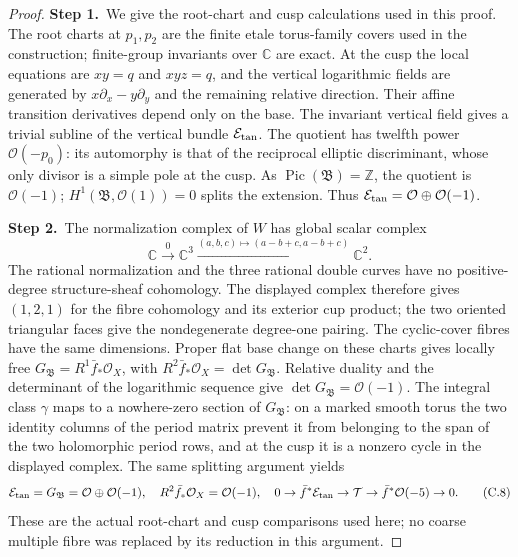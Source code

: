 \documentclass[11pt,a4paper]{article}
\theoremstyle{plain}
\theoremstyle{definition}
\DeclareMathOperator{\Pic}{Pic}
\begin{document}
\begin{proof}
\par\smallskip\noindent\textbf{Step 1.}\ We give the root-chart and cusp calculations used in this proof. The root charts at $p_1,p_2$ are the finite etale torus-family covers used in the construction; finite-group invariants over $\mathbb C$ are exact. At the cusp the local equations are $xy=q$ and $xyz=q$, and the vertical logarithmic fields are generated by $x\partial_x-y\partial_y$ and the remaining relative direction. Their affine transition derivatives depend only on the base. The invariant vertical field gives a trivial subline of the vertical bundle $\mathcal E_{\rm tan}$. The quotient has twelfth power $\mathcal O(-p_0)$: its automorphy is that of the reciprocal elliptic discriminant, whose only divisor is a simple pole at the cusp. As $\Pic(\mathfrak B)=\mathbb Z$, the quotient is $\mathcal O(-1)$; $H^1(\mathfrak B,\mathcal O(1))=0$ splits the extension. Thus $\mathcal E_{\rm tan}=\mathcal O\oplus\mathcal O(-1)$.

\par\smallskip\noindent\textbf{Step 2.}\ The normalization complex of $W$ has global scalar complex
\[
 \mathbb C\xrightarrow{0}\mathbb C^3
 \xrightarrow{(a,b,c)\mapsto(a-b+c,a-b+c)}\mathbb C^2.
\]
The rational normalization and the three rational double curves have no positive-degree structure-sheaf cohomology. The displayed complex therefore gives $(1,2,1)$ for the fibre cohomology and its exterior cup product; the two oriented triangular faces give the nondegenerate degree-one pairing. The cyclic-cover fibres have the same dimensions. Proper flat base change on these charts gives locally free $G_{\mathfrak B}=R^1\bar f_*\mathcal O_X$, with $R^2\bar f_*\mathcal O_X=\det G_{\mathfrak B}$. Relative duality and the determinant of the logarithmic sequence give $\det G_{\mathfrak B}=\mathcal O(-1)$. The integral class $\gamma$ maps to a nowhere-zero section of $G_{\mathfrak B}$: on a marked smooth torus the two identity columns of the period matrix prevent it from belonging to the span of the two holomorphic period rows, and at the cusp it is a nonzero cycle in the displayed complex. The same splitting argument yields
\[
\mathcal E_{\rm tan}=G_{\mathfrak B}=\mathcal O\oplus\mathcal O(-1),\quad R^2\bar f_*\mathcal O_X=\mathcal O(-1),
\quad0\to\bar f^*\mathcal E_{\rm tan}\to\mathcal T\to\bar f^*\mathcal O(-5)\to0. \tag{C.8}
\]
These are the actual root-chart and cusp comparisons used here; no coarse multiple fibre was replaced by its reduction in this argument.


\end{proof}
\end{document}
